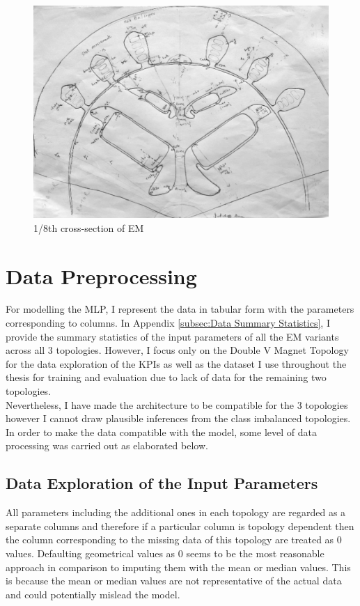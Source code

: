 \documentclass{report} %
\begin{document}
\begin{figure}[H]
    \centering
    \includegraphics[width=1\textwidth]{./ReportImages/EMCrosssectionFiltered.png} 
    \caption{1/8th cross-section of \ac{EM}}
    \label{fig:1/8 Motor Crossection}
\end{figure}

\section{Data Preprocessing}\label{sec:Data Preprocessing for MLP}
For modelling the \ac{MLP}, I represent the data in tabular form with the parameters corresponding to columns. 
In Appendix \ref{subsec:Data Summary Statistics}, I provide the summary statistics of the input parameters of all the \ac{EM} variants across all 3 topologies. 
However, I focus only on the Double V Magnet Topology for the data exploration of the \ac{KPI}s as well as the dataset I use throughout the thesis for training and 
evaluation due to lack of data for the remaining two topologies. \\
Nevertheless, I have made the architecture to be compatible for the 3 topologies however I cannot draw plausible inferences from the class imbalanced topologies. \\
In order to make the data compatible with the model, some level of data processing was carried out as elaborated below.

\subsection{Data Exploration of the Input Parameters}\label{subsec:Deep Dive into Input Parameters}
All parameters including the additional ones in each topology are regarded as a separate columns and therefore if a particular column is topology dependent then the 
column corresponding to the missing data of this topology are treated as 0 values. Defaulting geometrical values as 0 seems to be the most reasonable approach in comparison 
to imputing them with the mean or median values. This is because the mean or median values are not representative of the actual data and could potentially mislead the model.\\
\end{document}
